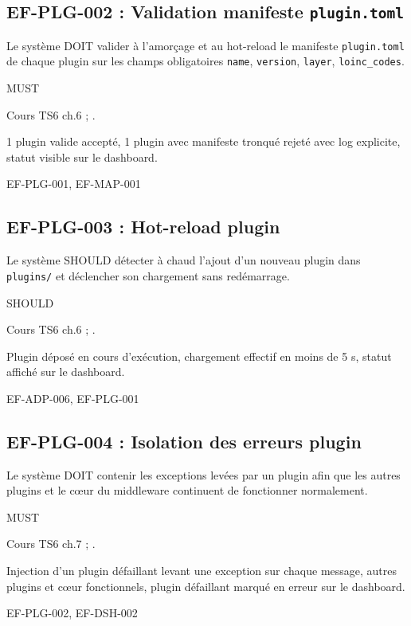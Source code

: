 \subsection*{EF-PLG-002 : Validation manifeste \texttt{plugin.toml}}
\begin{description}[leftmargin=2.5cm, style=nextline]
  \item[Énoncé] Le système DOIT valider à l'amorçage et au hot-reload le manifeste \texttt{plugin.toml} de chaque plugin sur les champs obligatoires \texttt{name}, \texttt{version}, \texttt{layer}, \texttt{loinc\_codes}.
  \item[Priorité] MUST
  \item[Source] Cours TS6 ch.6 ; \cite{ihe_pcd_tf}.
  \item[Recette] 1 plugin valide accepté, 1 plugin avec manifeste tronqué rejeté avec log explicite, statut visible sur le dashboard.
  \item[Lié à] EF-PLG-001, EF-MAP-001
\end{description}

\subsection*{EF-PLG-003 : Hot-reload plugin}
\begin{description}[leftmargin=2.5cm, style=nextline]
  \item[Énoncé] Le système SHOULD détecter à chaud l'ajout d'un nouveau plugin dans \texttt{plugins/} et déclencher son chargement sans redémarrage.
  \item[Priorité] SHOULD
  \item[Source] Cours TS6 ch.6 ; \cite{ihe_pcd_tf}.
  \item[Recette] Plugin déposé en cours d'exécution, chargement effectif en moins de 5 s, statut affiché sur le dashboard.
  \item[Lié à] EF-ADP-006, EF-PLG-001
\end{description}

\subsection*{EF-PLG-004 : Isolation des erreurs plugin}
\begin{description}[leftmargin=2.5cm, style=nextline]
  \item[Énoncé] Le système DOIT contenir les exceptions levées par un plugin afin que les autres plugins et le cœur du middleware continuent de fonctionner normalement.
  \item[Priorité] MUST
  \item[Source] Cours TS6 ch.7 ; \cite{ihe_pcd_tf}.
  \item[Recette] Injection d'un plugin défaillant levant une exception sur chaque message, autres plugins et cœur fonctionnels, plugin défaillant marqué en erreur sur le dashboard.
  \item[Lié à] EF-PLG-002, EF-DSH-002
\end{description}
